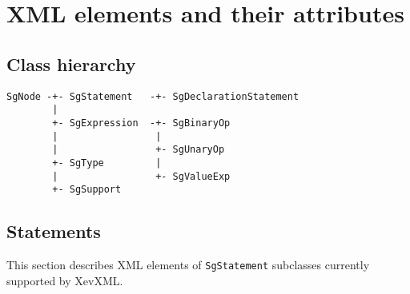\chapter{XML elements and their attributes}\label{sec:attrib}

\section{Class hierarchy}
\begin{verbatim}
SgNode -+- SgStatement   -+- SgDeclarationStatement
        |
        +- SgExpression  -+- SgBinaryOp
        |                 |
        |                 +- SgUnaryOp
        +- SgType         |
        |                 +- SgValueExp
        +- SgSupport 
\end{verbatim}
\section{Statements}
This section describes XML elements of \texttt{SgStatement} subclasses
currently supported by XevXML.  

